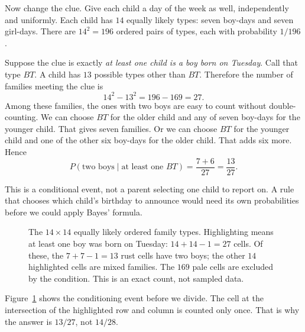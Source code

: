Now change the clue. Give each child a day of the week as well, independently and uniformly. Each child has $14$ equally likely types: seven boy-days and seven girl-days. There are $14^2=196$ ordered pairs of types, each with probability $1/196$.

Suppose the clue is exactly \emph{at least one child is a boy born on Tuesday}. Call that type $BT$. A child has $13$ possible types other than $BT$. Therefore the number of families meeting the clue is
\[
  14^2-13^2=196-169=27.
\]
Among these families, the ones with two boys are easy to count without double-counting. We can choose $BT$ for the older child and any of seven boy-days for the younger child. That gives seven families. Or we can choose $BT$ for the younger child and one of the other six boy-days for the older child. That adds six more. Hence
\[
  P(\text{two boys}\mid\text{at least one }BT)=\frac{7+6}{27}=\frac{13}{27}.
\]

This is a conditional event, not a parent selecting one child to report on. A rule that chooses which child's birthday to announce would need its own probabilities before we could apply Bayes' formula.

\begin{figure}[ht]
\centering
{}
\caption{The $14\times14$ equally likely ordered family types. Highlighting means at least one boy was born on Tuesday: $14+14-1=27$ cells. Of these, the $7+7-1=13$ rust cells have two boys; the other $14$ highlighted cells are mixed families. The $169$ pale cells are excluded by the condition. This is an exact count, not sampled data.}
\label{fig:tuesday}
\end{figure}

Figure~\ref{fig:tuesday} shows the conditioning event before we divide. The cell at the intersection of the highlighted row and column is counted only once. That is why the answer is $13/27$, not $14/28$.

